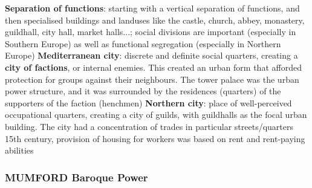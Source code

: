 \documentclass{article}
\begin{document}
\begin{outline}
	\1 \textbf{Separation of functions}: starting with a vertical separation of functions, and then specialised buildings and landuses like the castle, church, abbey, monastery, guildhall, city hall, market halls...; social divisions are important (especially in Southern Europe) as well as functional segregation (especially in Northern Europe)
		\2 \textbf{Mediterranean city}: discrete and definite social quarters, creating a \textbf{city of factions}, or internal enemies. This created an urban form that afforded protection for groups against their neighbours. The tower palace was the urban power structure, and it was surrounded by the residences (quarters) of the supporters of the faction (henchmen)
		\2 \textbf{Northern city}: place of well-perceived occupational quarters, creating a city of guilds, with guildhalls as the focal urban building. The city had a concentration of trades in particular streets/quarters
	\1 15th century, provision of housing for workers was based on rent and rent-paying abilities
\end{outline}

\subsubsection{MUMFORD Baroque Power}
\end{document}
